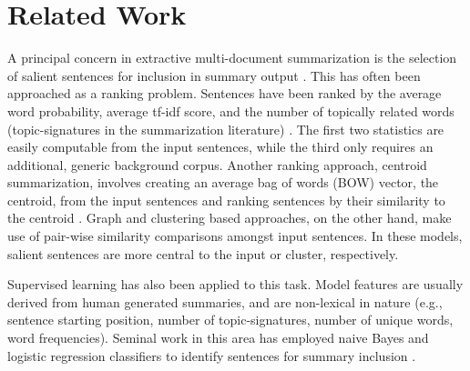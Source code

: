 \section{Related Work}
\label{sec:relatedwork}
A principal concern in extractive multi-document summarization is the
selection of salient sentences for inclusion in summary output
\cite{nenkova2012survey}.  This has often been approached as a ranking
problem.
Sentences have been ranked by the average word probability, average tf-idf
score, and the number of topically related words (topic-signatures in the
summarization literature)
\cite{nenkova2005impact,hovy1998automated,lin2000automated}. The first two
statistics are easily computable from the input sentences, while the third
only requires an additional, generic background corpus.  Another ranking
approach, centroid summarization, involves creating an average bag of words
(BOW) vector, the centroid, from the input sentences and ranking sentences by
their similarity to the centroid \cite{radev2004centroid}.  Graph
\cite{erkan2004lexrank} and clustering
\cite{hatzivassiloglou2001simfinder,mckeown1999towards,siddharthan2004syntactic}
based approaches, on the other hand, make use of pair-wise similarity
comparisons amongst input sentences.  In these models, salient sentences are
more central to the input or cluster, respectively.


Supervised learning has also been applied to this task. Model features are
usually derived from human generated summaries, and are non-lexical in nature
(e.g., sentence starting position, number of topic-signatures, number of
unique words, word frequencies). Seminal work in this area has employed naive
Bayes and logistic regression classifiers to identify sentences for summary
inclusion \cite{kupiec1995trainable,conroy2001using}. 

